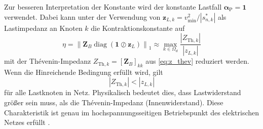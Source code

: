 Zur besseren Interpretation der Konstante wird der konstante Lastfall $\boldsymbol{\alpha}_\mathrm{P} = \mathbf{1}$ verwendet. 
Dabei kann unter der Verwendung von $\mathbf{z}_{L,k} = v_{\min}^2 / |s_{n,k}^{*}|$ als Lastimpedanz an Knoten $k$ die Kontraktionskonstante auf 
\begin{equation}
	\label{eq:eta_physical}
	\eta = \left\|\mathbf{Z}_B\operatorname{diag}(\mathbf{1} \oslash \mathbf{z}_L)\right\|_1 \approx \max_{k \in \Omega_d}\frac{|Z_{\text{Th},k}|}{|z_{L,k}|}
\end{equation}
mit der Thévenin-Impedanz $Z_{\text{Th},k} = [\mathbf{Z}_B]_{kk}$ aus \eqref{eq:z_thev} reduziert werden.
Wenn die Hinreichende Bedingung erfüllt wird, gilt 
\begin{equation}
	\label{eq:physical_condition}
	|Z_{\text{Th},k}| < |z_{L,k}|
\end{equation}
für alle Lastknoten in Netz.
Physikalisch bedeutet dies, dass Lastwiderstand größer sein muss, als die Thévenin-Impedanz (Innenwiderstand). 
Diese Charakteristik ist genau im hochspannungsseitigen Betriebspunkt des elektrischen Netzes erfüllt \cite{Giraldo2022}.



